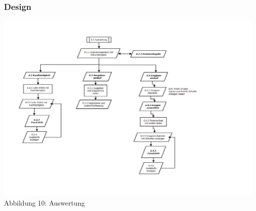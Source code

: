 \documentclass[12pt,a4paper]{article}
\begin{document}
\subsubsection*{Design}
\hspace*{-10mm} 
\includegraphics[trim = 20mm 60mm 0mm 20mm,clip,scale=0.9]{Auswertung.pdf}
\footnotesize Abbildung 10: Auswertung
\normalsize
\\
\end{document}
